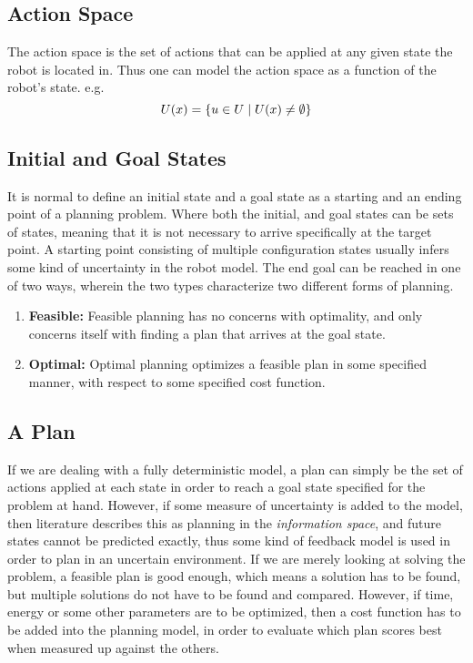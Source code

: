 \subsection{Action Space}
The action space is the set of actions that can be applied at any given state
the robot is located in. Thus one can model the action space as a function of
the robot's state. e.g.
\[
  U(x) = \lbrace u \in U \mid U(x) \neq \emptyset \rbrace
\]

\subsection{Initial and Goal States}
It is normal to define an initial state and a goal state as a starting and an
ending point of a planning problem. Where both the initial, and goal states can
be sets of states, meaning that it is not necessary to arrive specifically at
the target point. A starting point consisting of multiple configuration states
usually infers some kind of uncertainty in the robot model. The end goal can be
reached in one of two ways, wherein the two types characterize two different
forms of planning.
\begin{enumerate}
\item\textbf{Feasible:} Feasible planning has no concerns with optimality, and
  only concerns itself with finding a plan that arrives at the goal state.
\item\textbf{Optimal:} Optimal planning optimizes a feasible plan in some
  specified manner, with respect to some specified cost function.
\end{enumerate}

\subsection{A Plan}
If we are dealing with a fully deterministic model, a plan can simply be the set
of actions applied at each state in order to reach a goal state specified for
the problem at hand. However, if some measure of uncertainty is added to the
model, then literature describes this as planning in the \textit{information
  space}, and future states cannot be predicted exactly, thus some kind of
feedback model is used in order to plan in an uncertain environment. If we are
merely looking at solving the problem, a feasible plan is good enough, which
means a solution has to be found, but multiple solutions do not have to be found
and compared. However, if time, energy or some other parameters are to be
optimized, then a cost function has to be added into the planning model, in
order to evaluate which plan scores best when measured up against the others.

